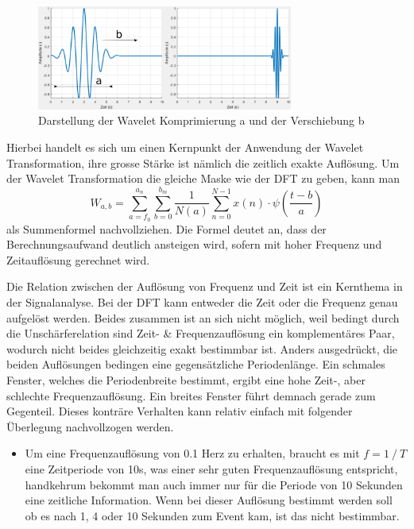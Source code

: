 \begin{figure}
	\centering
	\includegraphics[width=0.75\textwidth]{papers/wavelets/images/5_WaveletKompUndShift.png}
	\caption{Darstellung der Wavelet Komprimierung a und der Verschiebung b}
	\label{wavelet:fig:5_WaveletKompUndShift}
\end{figure}

Hierbei handelt es sich um einen Kernpunkt der Anwendung der Wavelet Transformation, ihre grosse Stärke ist nämlich die zeitlich exakte Auflösung. Um der Wavelet Transformation die gleiche Maske wie der DFT zu geben, kann man
\begin{equation}
	W_{a,b}=\sum_{a=f_0}^{a_n}\sum_{b=0}^{b_m}\frac{1}{N(a)}\sum_{n=0}^{N-1} x(n)\cdot\psi\left(\frac{t-b}{a}\right)
	\label{wavelets:equation4}
\end{equation}
als Summenformel nachvollziehen. Die Formel deutet an, dass der Berechnungsaufwand deutlich ansteigen wird, sofern mit hoher Frequenz und Zeitauflösung gerechnet wird.

Die Relation zwischen der Auflösung von Frequenz und Zeit ist ein Kernthema in der Signalanalyse. Bei der DFT kann entweder die Zeit oder die Frequenz genau aufgelöst werden. Beides zusammen ist an sich nicht möglich,
weil bedingt durch die Unschärferelation sind Zeit- \& Frequenzauflösung ein komplementäres Paar, wodurch nicht beides gleichzeitig exakt bestimmbar ist. Anders ausgedrückt, die beiden Auflösungen bedingen eine gegensätzliche Periodenlänge. Ein schmales Fenster, welches die Periodenbreite bestimmt, ergibt eine hohe Zeit-, aber schlechte Frequenzauflösung. Ein breites Fenster führt demnach gerade zum Gegenteil.
Dieses konträre Verhalten kann relativ einfach mit folgender Überlegung nachvollzogen werden.
\begin{itemize}
\item Um eine Frequenzauflösung von 0.1 Herz zu erhalten, braucht es mit $f=1⁄T$ eine Zeitperiode von 10s, was einer sehr guten Frequenzauflösung entspricht, handkehrum bekommt man auch immer nur für die Periode von 10 Sekunden eine zeitliche Information. Wenn bei dieser Auflösung bestimmt werden soll ob es nach 1, 4 oder 10 Sekunden zum Event kam, ist das nicht bestimmbar.
\end{itemize}
 
